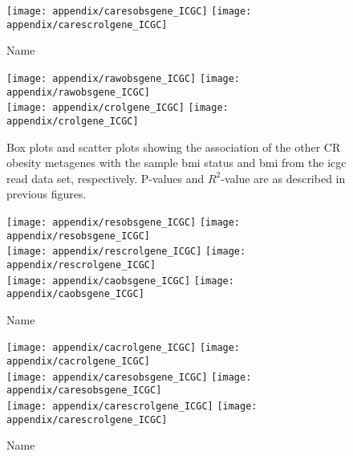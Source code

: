 \begin{appendices}
	\begin{figure}[htpb]
		\ContinuedFloat
		\captionsetup{list=off,format=cont}
		\centering
		\texttt{[image: appendix/caresobsgene\_ICGC]}
		\hfill
		\texttt{[image: appendix/carescrolgene\_ICGC]}\\
		\caption{Name}
	\end{figure}

	\begin{figure}[!htpb]
		\centering
		\texttt{[image: appendix/rawobsgene\_ICGC]}
		\hfill
		\texttt{[image: appendix/rawobsgene\_ICGC]}\\
		\texttt{[image: appendix/crolgene\_ICGC]}
		\hfill
		\texttt{[image: appendix/crolgene\_ICGC]}\\
		\caption{Box plots and scatter plots showing the association of the other CR obesity metagenes with the sample \gls{bmi} status  and \gls{bmi} from the \gls{icgc} \gls{read} data set, respectively.
	P-values and $R^2$-value are as described in previous figures.}
		\label{fig:appendix/cr_ob_meta_box_scatter_read}
	\end{figure}

	\begin{figure}[htpb]
		\ContinuedFloat
		\captionsetup{list=off,format=cont}
		\centering
		\texttt{[image: appendix/resobsgene\_ICGC]}
		\hfill
		\texttt{[image: appendix/resobsgene\_ICGC]}\\
		\texttt{[image: appendix/rescrolgene\_ICGC]}
		\hfill
		\texttt{[image: appendix/rescrolgene\_ICGC]}\\
		\texttt{[image: appendix/caobsgene\_ICGC]}
		\hfill
		\texttt{[image: appendix/caobsgene\_ICGC]}\\
		\caption{Name}
	\end{figure}

	\begin{figure}[htpb]
		\ContinuedFloat
		\captionsetup{list=off,format=cont}
		\centering
		\texttt{[image: appendix/cacrolgene\_ICGC]}
		\hfill
		\texttt{[image: appendix/cacrolgene\_ICGC]}\\
		\texttt{[image: appendix/caresobsgene\_ICGC]}
		\hfill
		\texttt{[image: appendix/caresobsgene\_ICGC]}\\
		\texttt{[image: appendix/carescrolgene\_ICGC]}
		\hfill
		\texttt{[image: appendix/carescrolgene\_ICGC]}\\
		\caption{Name}
	\end{figure}


\end{appendices}
